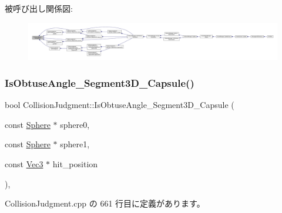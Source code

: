 被呼び出し関係図\+:
\nopagebreak
\begin{figure}[H]
\begin{center}
\leavevmode
\includegraphics[width=350pt]{class_collision_judgment_a5fd5784d3e7d0ce09f5bda5603a8ca36_icgraph}
\end{center}
\end{figure}
\mbox{\label{class_collision_judgment_a58785d1cd51b4d7af4c19dca42d842e5}} 
\subsubsection{\texorpdfstring{Is\+Obtuse\+Angle\+\_\+\+Segment3\+D\+\_\+\+Capsule()}{IsObtuseAngle\_Segment3D\_Capsule()}}
{\footnotesize\ttfamily bool Collision\+Judgment\+::\+Is\+Obtuse\+Angle\+\_\+\+Segment3\+D\+\_\+\+Capsule (\begin{DoxyParamCaption}\item[{const \mbox{\hyperlink{class_sphere}{Sphere}} $\ast$}]{sphere0,  }\item[{const \mbox{\hyperlink{class_sphere}{Sphere}} $\ast$}]{sphere1,  }\item[{const \mbox{\hyperlink{_vector3_d_8h_ab16f59e4393f29a01ec8b9bbbabbe65d}{Vec3}} $\ast$}]{hit\+\_\+position }\end{DoxyParamCaption})\hspace{0.3cm}{\ttfamily [static]}, {\ttfamily [private]}}



 Collision\+Judgment.\+cpp の 661 行目に定義があります。

